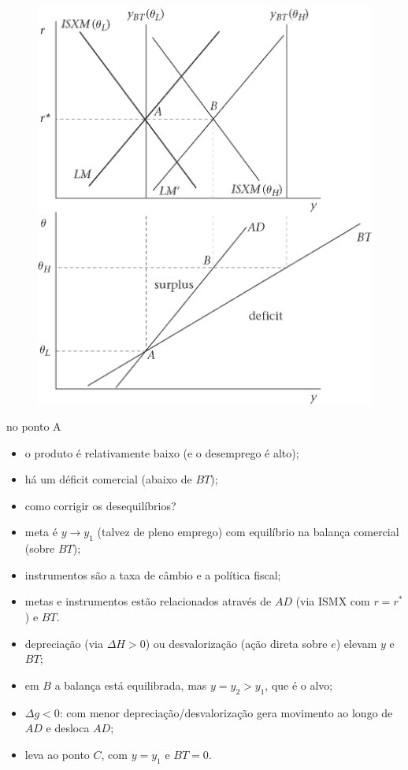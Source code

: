 \documentclass[a4paper,12pt]{article}[abntex2]
\begin{document}
\begin{figure}[H]
    \centering
    \includegraphics[width=0.7\linewidth]{Imagens/a26i6.png}
\end{figure}

no ponto A  
\begin{itemize}
    \item o produto é relativamente baixo (e o desemprego é alto);
    \item há um déficit comercial (abaixo de \( BT \));
    \item como corrigir os desequilíbrios?
\end{itemize}

\begin{itemize}
    \item meta é \( y \rightarrow y_1 \) (talvez de pleno emprego) com equilíbrio na balança comercial (sobre \( BT \));
    \item instrumentos são a taxa de câmbio e a política fiscal;
    \item metas e instrumentos estão relacionados através de \( AD \) (via ISMX com \( r = r^* \)) e \( BT \).
\end{itemize}

\begin{itemize}
    \item depreciação (via \( \Delta H > 0 \)) ou desvalorização (ação direta sobre \( e \)) elevam \( y \) e \( BT \);
    \item em \( B \) a balança está equilibrada, mas \( y = y_2 > y_1 \), que é o alvo;
    \item \( \Delta g < 0 \): com menor depreciação/desvalorização gera movimento ao longo de \( AD \) e desloca \( AD \);
    \item leva ao ponto \( C \), com \( y = y_1 \) e \( BT = 0 \).
\end{itemize}
\end{document}
